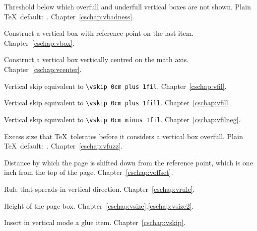 \begin{glossinventory}
\item [\cs{vbadness}]
      Threshold below which overfull and underfull vertical boxes 
      are not shown.
      Plain \TeX\ default:~.
Chapter~\ref{cschap:vbadness}.

\item [\cs{vbox\gr{box specification}\lb\gr{vertical material}\rb}]
      Construct a vertical box with reference point on the last item. 
Chapter~\ref{cschap:vbox}.

\item [\cs{vcenter\gr{box specification}\lb\gr{vertical material}\rb}]
      Construct a  vertical box vertically centred on the math axis.
Chapter~\ref{cschap:vcenter}.

\item [\cs{vfil}]
      Vertical skip equivalent to \verb-\vskip 0cm plus 1fil-.
Chapter~\ref{cschap:vfil}.

\item [\cs{vfill}]
      Vertical skip equivalent to \verb-\vskip 0cm plus 1fill-.
Chapter~\ref{cschap:vfill}.

\item [\cs{vfilneg}]
      Vertical skip equivalent to \verb-\vskip 0cm minus 1fil-.
Chapter~\ref{cschap:vfilneg}.

\item [\cs{vfuzz}]
      Excess size that \TeX\ tolerates before it considers  
      a vertical box overfull.
      Plain \TeX\ default:~\n{0.1pt}.
Chapter~\ref{cschap:vfuzz}.

\item [\cs{voffset}]
      Distance by which the page is shifted down from the reference point,
      which is one inch from the top of the page.
Chapter~\ref{cschap:voffset}.

\item [\cs{vrule}]
      Rule that spreads in vertical direction.
Chapter~\ref{cschap:vrule}.

\item [\cs{vsize}]
      Height of the page box.
Chapter~\ref{cschap:vsize},\ref{cschap:vsize2}.

\item [\cs{vskip\gr{glue}}]
      Insert in vertical mode a glue item.
Chapter~\ref{cschap:vskip}.


\end{glossinventory}
